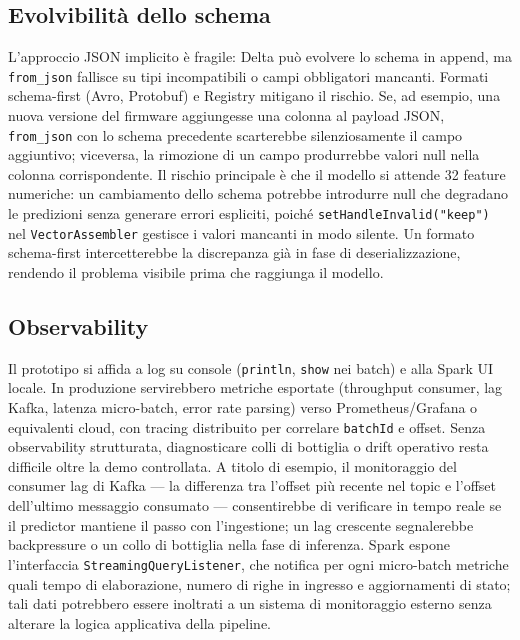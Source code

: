\subsection{Evolvibilità dello schema}

L'approccio JSON implicito è fragile: Delta può evolvere lo schema in append, ma \texttt{from\_json} fallisce su tipi incompatibili o campi obbligatori mancanti.
Formati schema-first (Avro, Protobuf) e Registry mitigano il rischio.
Se, ad esempio, una nuova versione del firmware aggiungesse una colonna al payload JSON, \texttt{from\_json} con lo schema precedente scarterebbe silenziosamente il campo aggiuntivo; viceversa, la rimozione di un campo produrrebbe valori null nella colonna corrispondente.
Il rischio principale è che il modello si attende 32 feature numeriche: un cambiamento dello schema potrebbe introdurre null che degradano le predizioni senza generare errori espliciti, poiché \texttt{setHandleInvalid("keep")} nel \texttt{VectorAssembler} gestisce i valori mancanti in modo silente.
Un formato schema-first intercetterebbe la discrepanza già in fase di deserializzazione, rendendo il problema visibile prima che raggiunga il modello.

\subsection{Observability}

Il prototipo si affida a log su console (\texttt{println}, \texttt{show} nei batch) e alla Spark UI locale.
In produzione servirebbero metriche esportate (throughput consumer, lag Kafka, latenza micro-batch, error rate parsing) verso Prometheus/Grafana o equivalenti cloud, con tracing distribuito per correlare \texttt{batchId} e offset.
Senza observability strutturata, diagnosticare colli di bottiglia o drift operativo resta difficile oltre la demo controllata.
A titolo di esempio, il monitoraggio del consumer lag di Kafka --- la differenza tra l'offset più recente nel topic e l'offset dell'ultimo messaggio consumato --- consentirebbe di verificare in tempo reale se il predictor mantiene il passo con l'ingestione; un lag crescente segnalerebbe backpressure o un collo di bottiglia nella fase di inferenza.
Spark espone l'interfaccia \texttt{StreamingQueryListener}, che notifica per ogni micro-batch metriche quali tempo di elaborazione, numero di righe in ingresso e aggiornamenti di stato; tali dati potrebbero essere inoltrati a un sistema di monitoraggio esterno senza alterare la logica applicativa della pipeline.

